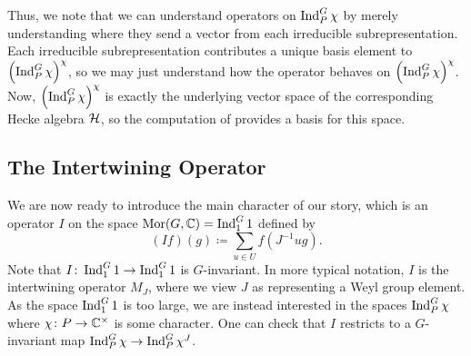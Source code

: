 Thus, we note that we can understand operators on $\operatorname{Ind}^G_P\chi$ by merely understanding where they send a vector from each irreducible subrepresentation. Each irreducible subrepresentation contributes a unique basis element to $\left(\operatorname{Ind}^G_P\chi\right)^\chi$, so we may just understand how the operator behaves on $\left(\operatorname{Ind}^G_P\chi\right)^\chi$. Now, $\left(\operatorname{Ind}^G_P\chi\right)^\chi$ is exactly the underlying vector space of the corresponding Hecke algebra $\mathcal{H}$, so the computation of  provides a basis for this space. %

\subsection{The Intertwining Operator}
We are now ready to introduce the main character of our story, which is an operator $I$ on the space $\operatorname{Mor}(G,\mathbb C)=\operatorname{Ind}^G_11$ defined by
\[(If)(g)\coloneqq\sum_{u\in U}f\left(J^{-1}ug\right).\]
Note that $I\colon\operatorname{Ind}^G_11\to\operatorname{Ind}^G_11$ is $G$-invariant. In more typical notation, $I$ is the intertwining operator $M_J$, where we view $J$ as representing a Weyl group element. As the space $\operatorname{Ind}^G_11$ is too large, we are instead interested in the spaces $\operatorname{Ind}_P^G\chi$ where $\chi\colon P\to\mathbb C^\times$ is some character. One can check that $I$ restricts to a $G$-invariant map $\operatorname{Ind}_P^G\chi\to\operatorname{Ind}_P^G\chi^J$.

